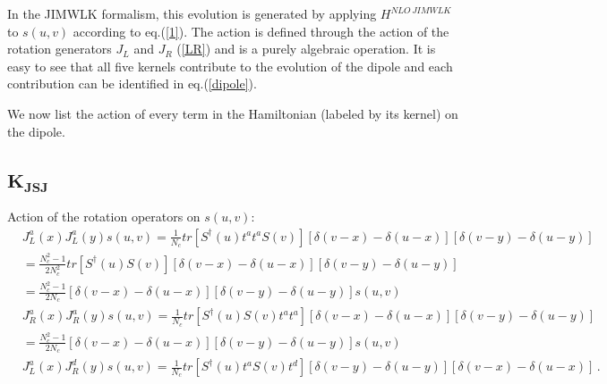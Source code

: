 \documentclass[11pt,a4paper]{article}
\begin{document}
In the JIMWLK formalism, this
evolution is generated by applying $H^{NLO\,JIMWLK}$ to $s(u,v)$ according to eq.(\ref{1}). The action is defined through the action of the rotation generators $J_L$ 
and $J_R$ (\ref{LR}) and is a purely algebraic operation. It is easy to see that all five kernels contribute to the evolution of the dipole and each contribution can be identified in eq.(\ref{dipole}).

We now list the action  of every term in the Hamiltonian (labeled by its kernel) on the dipole.                  

\subsection*{$\ensuremath{\mathbf{K_{JSJ}}}$}
Action of the rotation operators on  $s(u,v)$:
\begin{equation}\begin{split}&J_{L}^{a}(x)J_{L}^{a}(y)s(u,v)=\frac{1}{N_{c}}tr\left[S^{\dagger}(u)t^{a}t^{a}S(v)\right]\left[\delta(v-x)-\delta(u-x)\right]\left[\delta(v-y)-\delta(u-y)\right]\\
&=\frac{N^{2}_{c}-1}{2N^{2}_{c}}tr\left[S^{\dagger}(u)S(v)\right]\left[\delta(v-x)-\delta(u-x)\right]\left[\delta(v-y)-\delta(u-y)\right]\\
&=\frac{N^{2}_{c}-1}{2N_{c}}\left[\delta(v-x)-\delta(u-x)\right]\left[\delta(v-y)-\delta(u-y)\right]s(u,v)\\
&J_{R}^{a}(x)J_{R}^{a}(y)s(u,v)=\frac{1}{N_{c}}tr\left[S^{\dagger}(u)S(v)t^{a}t^{a}\right]\left[\delta(v-x)-\delta(u-x)\right]\left[\delta(v-y)-\delta(u-y)\right]\\
&=\frac{N^{2}_{c}-1}{2N_{c}}\left[\delta(v-x)-\delta(u-x)\right]\left[\delta(v-y)-\delta(u-y)\right]s(u,v)\\
&J_{L}^{a}(x)J_{R}^{d}(y)s(u,v)=\frac{1}{N_{c}}tr\left[S^{\dagger}(u)t^{a}S(v)t^{d}\right]\left[\delta(v-y)-\delta(u-y)\right]\left[\delta(v-x)-\delta(u-x)\right]\,.
\label{jj}
\end{split}\end{equation}
\end{document}
